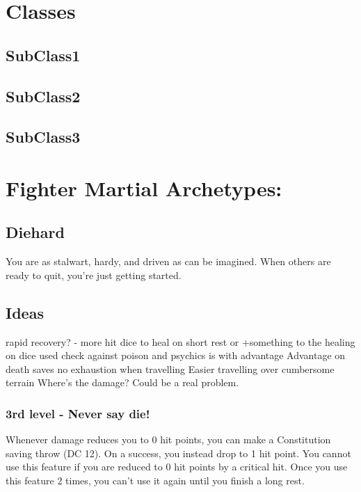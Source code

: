 \clearpage
\section{Classes}
\lipsum[1]

\subsection{SubClass1}
\lipsum[1-2]
\newpage

\subsection{SubClass2}
\lipsum[1-3]
\newpage

\subsection{SubClass3}
\lipsum[1-2]

\clearpage
\section{Fighter Martial Archetypes:}
\subsection{Diehard}
You are as stalwart, hardy, and driven as can be imagined. When others are ready to quit, you’re just getting started.

\subsection{Ideas}
rapid recovery? - more hit dice to heal on short rest or +something to the healing on dice used
check against poison and psychics is with advantage
Advantage on death saves
no exhaustion when travelling
Easier travelling over cumbersome terrain
Where's the damage? Could be a real problem.

\subsubsection{3rd level - Never say die!}
Whenever damage reduces you to 0 hit points, you can make a Constitution saving throw (DC 12). On a success, you instead drop to 1 hit point. You cannot use this feature if you are reduced to 0 hit points by a  critical hit.
Once you use this feature 2 times, you can’t use it again until you finish a long rest.

